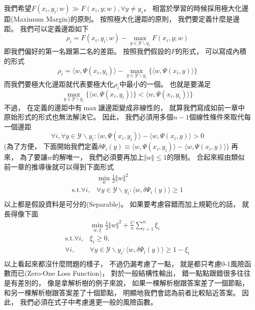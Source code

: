   我們希望$F(x_i, y_i; w) \gg F(x_i, y; w), \forall y \neq y_i$，
  相當於學習的時候採用極大化邊距(Maximum Margin)的原則。
  按照極大化邊距的原則，
  我們要定義什麼是邊距。
  我們可以定義邊距如下
  \begin{equation}
    \rho_i = F(x_i, y_i; w) - \max_{y \in \mathcal{Y} \backslash y_i} F(x_i, y; w)
  \end{equation}
  即我們偏好的第一名跟第二名的差距。
  按照我們假設的$F$的形式，
  可以寫成內積的形式
  \begin{equation}
    \rho_i = \langle w, \Psi(x_i, y_i) \rangle - \max_{y \in \mathcal{Y} \backslash y_i} \lbrace \langle w, \Psi(x_i, y) \rangle \rbrace 
  \end{equation}
  而我們要極大化邊距就代表要極大化$\rho_i$中最小的一個。
  也就是要滿足
  \begin{equation}
    \max_{y \in \mathcal{Y} \backslash y_i} \lbrace \langle w, \Psi(x_i, y_i) \rangle \rbrace < \langle w, \Psi(x_i, y_i) \rangle \rbrace
  \end{equation}
  不過，
  在定義的邊距中有$\max$讓邊距變成非線性的，
  就算我們寫成如前一章中原始形式的形式也無法解決它。
  因此，
  我們必須用多個$n-1$個線性條件來取代每一個邊距
  \begin{equation}
    \forall i, \forall y \in \mathcal{Y} \backslash y_i: \langle w, \Psi(x_i, y_i) \rangle - \langle w, \Psi(x_i, y) \rangle > 0
  \end{equation}
  (為了方便，
  下面開始我們定義$\delta \Psi_i(y) \equiv \langle w, \Psi(x_i, y_i) \rangle - \langle w, \Psi(x_i, y) \rangle$)
  再來，
  為了要讓$w$的解唯一，
  我們必須要再加上$\Vert w \Vert \leq 1$的限制。
  合起來經由類似前一章的推導後就可以得到下面形式 
  \begin{equation}
    \begin{split}
      & \min_w \frac{1}{2} \Vert w \Vert^2 \\
      \text{s.t.} \forall i, &\forall y \in \mathcal{Y} \backslash y_i:
      \langle w, \delta \Psi_i(y) \rangle \geq 1 \\
    \end{split}
  \end{equation}
  以上都是假設資料是可分的(Separable)。
  如果要考慮容錯而加上規範化的話，
  就長得像下面
  \begin{equation}
    \begin{split}
      &\min_{w, \xi} \frac{1}{2} \Vert w \Vert^2 + \frac{C}{n} \sum_{i=1}^n \xi_i \\
      \text{s.t.} \forall i, &\xi_i \geq 0, \\
      \forall i, & \forall y \in \mathcal{Y} \backslash y_i:
      \langle w, \delta \Psi_i(y) \rangle \geq 1 - \xi_i \\
    \end{split}
  \end{equation}
  以上看起來都沒什麼問題的樣子，
  不過仍漏考慮了一點，
  就是都只考慮0-1風險函數而已(Zero-One Loss Function)，
  對於一般結構性輸出，
  錯一點點跟錯很多往往是有差別的，
  像是拿解析樹的例子來說，
  如果一棵解析樹跟答案差了一個節點，
  和另一棵解析樹跟答案差了十個節點，
  明顯地我們會認為前者比較貼近答案。
  因此，
  我們必須在式子中考慮進更一般的風險函數。

